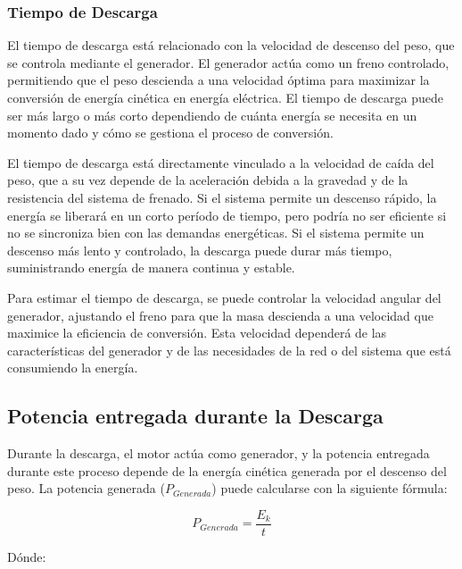             \subsubsection{Tiempo de Descarga}
                El tiempo de descarga está relacionado con la velocidad de descenso del peso, que se controla mediante el generador. El generador actúa como un freno controlado, permitiendo que el peso descienda a una velocidad óptima para maximizar la conversión de energía cinética en energía eléctrica. El tiempo de descarga puede ser más largo o más corto dependiendo de cuánta energía se necesita en un momento dado y cómo se gestiona el proceso de conversión.\par
                El tiempo de descarga está directamente vinculado a la velocidad de caída del peso, que a su vez depende de la aceleración debida a la gravedad y de la resistencia del sistema de frenado. Si el sistema permite un descenso rápido, la energía se liberará en un corto período de tiempo, pero podría no ser eficiente si no se sincroniza bien con las demandas energéticas. Si el sistema permite un descenso más lento y controlado, la descarga puede durar más tiempo, suministrando energía de manera continua y estable.\par
                Para estimar el tiempo de descarga, se puede controlar la velocidad angular del generador, ajustando el freno para que la masa descienda a una velocidad que maximice la eficiencia de conversión. Esta velocidad dependerá de las características del generador y de las necesidades de la red o del sistema que está consumiendo la energía.\par

        \subsection{Potencia entregada durante la Descarga}
            Durante la descarga, el motor actúa como generador, y la potencia entregada durante este proceso depende de la energía cinética generada por el descenso del peso. La potencia generada ($P_{Generada}$) puede calcularse con la siguiente fórmula:\par

            \begin{equation}
                P_{Generada} = \frac{E_k}{t}
            \end{equation}

            Dónde:\par
            
